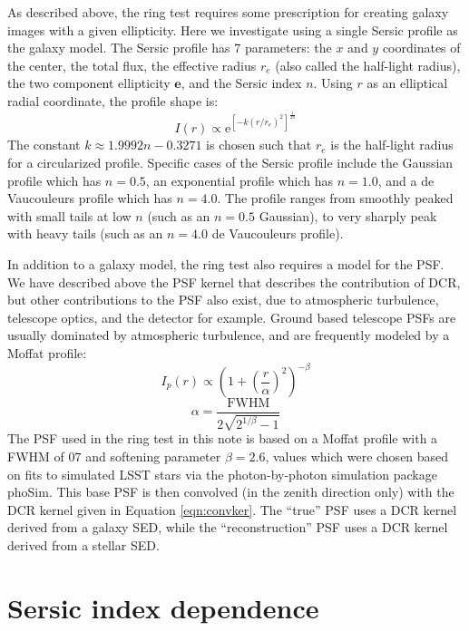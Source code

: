 \documentclass[apj]{emulateapj}
\begin{document}
As described above, the ring test requires some prescription for
creating galaxy images with a given ellipticity.  Here we investigate
using a single Sersic profile as the galaxy model.  The Sersic profile
has 7 parameters: the $x$ and $y$ coordinates of the center, the total
flux, the effective radius $r_e$ (also called the half-light radius),
the two component ellipticity $\mathbf{e}$, and the Sersic index $n$.
Using $r$ as an elliptical radial coordinate, the profile shape is:
\begin{equation}
  I(r) \propto \mathrm{e}^{[-k (r/r_e)^2]^{\frac{1}{2 n}}}
\end{equation}
The constant $k \approx 1.9992 n - 0.3271$ is chosen such that $r_e$
is the half-light radius for a circularized profile.  Specific cases
of the Sersic profile include the Gaussian profile which has $n=0.5$,
an exponential profile which has $n=1.0$, and a de Vaucouleurs profile
which has $n=4.0$.  The profile ranges from smoothly peaked with small
tails at low $n$ (such as an $n=0.5$ Gaussian), to very sharply peak
with heavy tails (such as an $n=4.0$ de Vaucouleurs profile).

In addition to a galaxy model, the ring test also requires a model for
the PSF.  We have described above the PSF kernel that describes the
contribution of DCR, but other contributions to the PSF also exist,
due to atmospheric turbulence, telescope optics, and the detector for
example.  Ground based telescope PSFs are usually dominated by
atmospheric turbulence, and are frequently modeled by a Moffat
profile:
\begin{equation}
  I_p(r) \propto \left(1+\left(\frac{r}{\alpha}\right)^2\right)^{-\beta}
\end{equation}
\begin{equation}
  \alpha = \frac{\mathrm{FWHM}}{2\sqrt{2^{1/\beta}-1}}
\end{equation}
The PSF used in the ring test in this note is based on a Moffat
profile with a FWHM of $0$\farcs$7$ and softening parameter $\beta =
2.6$, values which were chosen based on fits to simulated LSST stars
via the photon-by-photon simulation package phoSim.  This base PSF is
then convolved (in the zenith direction only) with the DCR kernel
given in Equation \ref{eqn:convker}.  The ``true'' PSF uses a DCR
kernel derived from a galaxy SED, while the ``reconstruction'' PSF
uses a DCR kernel derived from a stellar SED.

\section{Sersic index dependence}\label{sec:sersic}
\end{document}
